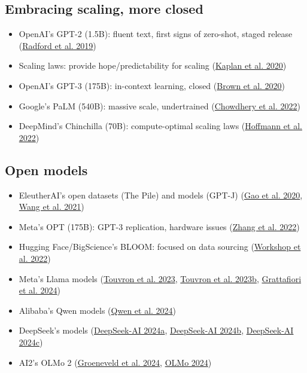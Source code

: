 \subsection*{Embracing scaling, more closed}
\begin{itemize}[leftmargin=*]
  \item OpenAI's GPT-2 (1.5B): fluent text, first signs of zero-shot, staged release (\href{https://cdn.openai.com/better-language-models/language_models_are_unsupervised_multitask_learners.pdf}{Radford et al. 2019})
  \item Scaling laws: provide hope/predictability for scaling (\href{https://arxiv.org/abs/2001.08361}{Kaplan et al. 2020})
  \item OpenAI's GPT-3 (175B): in-context learning, closed (\href{https://arxiv.org/abs/2005.14165}{Brown et al. 2020})
  \item Google's PaLM (540B): massive scale, undertrained (\href{https://arxiv.org/abs/2204.02311}{Chowdhery et al. 2022})
  \item DeepMind's Chinchilla (70B): compute-optimal scaling laws (\href{https://arxiv.org/abs/2203.15556}{Hoffmann et al. 2022})
\end{itemize}

\subsection*{Open models}
\begin{itemize}[leftmargin=*]
  \item EleutherAI's open datasets (The Pile) and models (GPT-J) (\href{https://arxiv.org/abs/2101.00027}{Gao et al. 2020}, \href{https://arxiv.org/abs/2104.08691}{Wang et al. 2021})
  \item Meta's OPT (175B): GPT-3 replication, hardware issues (\href{https://arxiv.org/abs/2205.01068}{Zhang et al. 2022})
  \item Hugging Face/BigScience's BLOOM: focused on data sourcing (\href{https://arxiv.org/abs/2211.05100}{Workshop et al. 2022})
  \item Meta's Llama models (\href{https://arxiv.org/abs/2302.03781}{Touvron et al. 2023}, \href{https://arxiv.org/abs/2305.00000}{Touvron et al. 2023b}, \href{https://arxiv.org/abs/2403.00000}{Grattafiori et al. 2024})
  \item Alibaba's Qwen models (\href{https://arxiv.org/abs/2401.00000}{Qwen et al. 2024})
  \item DeepSeek's models (\href{https://example.com/deepseek-2024a}{DeepSeek-AI 2024a}, \href{https://example.com/deepseek-2024b}{DeepSeek-AI 2024b}, \href{https://example.com/deepseek-2024c}{DeepSeek-AI 2024c})
  \item AI2's OLMo 2 (\href{https://example.com/olmo2-2024}{Groeneveld et al. 2024}, \href{https://example.com/olmo2b-2024}{OLMo 2024})
\end{itemize}

